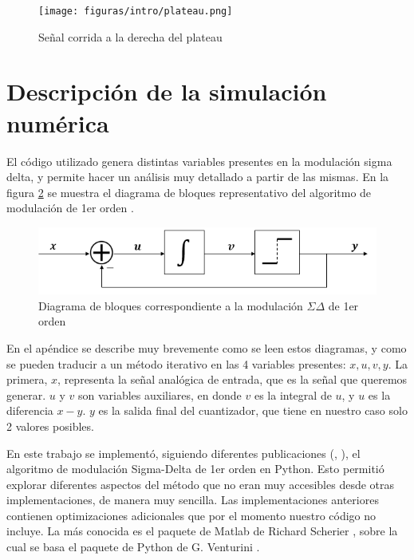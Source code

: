 \documentclass[twoside]{article}
\begin{document}
\begin{multicols}{2}
\begin{figure}[H]
    \centering
    \texttt{[image: figuras/intro/plateau.png]}
    \caption{Señal corrida a la derecha del plateau}
    \label{fig:intro_plateau}
\end{figure}

\section{Descripción de la simulación numérica}

El código utilizado genera distintas variables presentes en la modulación sigma delta, y permite hacer un análisis muy detallado a partir de las mismas. En la figura \ref{fig:bloques} se muestra el diagrama de bloques representativo del algoritmo de modulación de 1er orden \cite{script}.

\begin{figure}[H]
\centering
\includegraphics[width=\linewidth]{figuras/bloques_1erorden.png}
\caption{Diagrama de bloques correspondiente a la modulación $\Sigma\Delta$ de 1er orden}
\label{fig:bloques}
\end{figure}

En el apéndice se describe muy brevemente como se leen estos diagramas, y como se pueden traducir a un método iterativo en las 4 variables presentes: $x,u,v,y$.
La primera, $x$, representa la señal analógica de entrada, que es la señal que queremos generar. $u$ y $v$ son variables auxiliares, en donde $v$ es la integral de $u$, y $u$ es la diferencia $x-y$. $y$ es la salida final del cuantizador, que tiene en nuestro caso solo 2 valores posibles.


En este trabajo se implementó, siguiendo diferentes publicaciones (\cite{delarosa2011}, \cite{aziz1996}), el algoritmo de modulación Sigma-Delta de 1er orden en Python. Esto permitió explorar diferentes aspectos del método que no eran muy accesibles desde otras implementaciones, de manera muy sencilla.
Las implementaciones anteriores contienen optimizaciones adicionales que por el momento nuestro código no incluye. La más conocida es el paquete de Matlab de Richard Scherier \cite{DSmatlab}, sobre la cual se basa el paquete de Python de G. Venturini \cite{DSpython}. %


\end{multicols}
\end{document}

